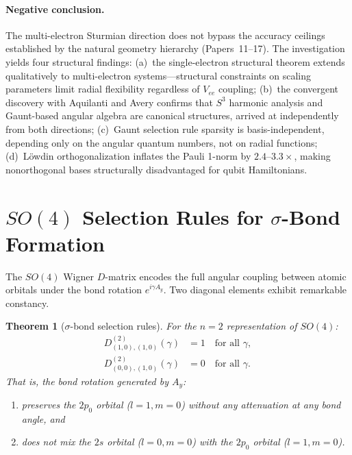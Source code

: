 \documentclass[aps,pra,twocolumn,superscriptaddress,longbibliography]{revtex4-2}
\newtheorem{theorem}{Theorem}
\theoremstyle{remark}
\theoremstyle{plain}
\begin{document}
\paragraph{Negative conclusion.}
The multi-electron Sturmian direction does not bypass the accuracy
ceilings established by the natural geometry hierarchy
(Papers~11--17).  The investigation yields four structural findings:
(a)~the single-electron structural theorem extends qualitatively to
multi-electron systems---structural constraints on scaling parameters
limit radial flexibility regardless of $V_{ee}$ coupling;
(b)~the convergent discovery with Aquilanti and Avery confirms that
$S^3$ harmonic analysis and Gaunt-based angular algebra are
canonical structures, arrived at independently from both directions;
(c)~Gaunt selection rule sparsity is basis-independent, depending only
on the angular quantum numbers, not on radial functions;
(d)~L\"owdin orthogonalization inflates the Pauli 1-norm by
$2.4$--$3.3\times$, making nonorthogonal bases structurally disadvantaged
for qubit Hamiltonians.


\section{$SO(4)$ Selection Rules for $\sigma$-Bond Formation}
\label{sec:selection_rules}

The $SO(4)$ Wigner $D$-matrix encodes the full angular coupling between
atomic orbitals under the bond rotation $e^{i\gamma A_y}$.  Two diagonal
elements exhibit remarkable constancy.

\begin{theorem}[$\sigma$-bond selection rules]
\label{thm:selection}
For the $n = 2$ representation of $SO(4)$:
\begin{align}
D^{(2)}_{(1,0),(1,0)}(\gamma) &= 1 \quad \text{for all } \gamma,
\label{eq:D2_1010} \\
D^{(2)}_{(0,0),(1,0)}(\gamma) &= 0 \quad \text{for all } \gamma.
\label{eq:D2_0010}
\end{align}
That is, the bond rotation generated by $A_y$:
\begin{enumerate}
\item preserves the $2p_0$ orbital ($l = 1, m = 0$) without any
attenuation at any bond angle, and
\item does not mix the $2s$ orbital ($l = 0, m = 0$) with the $2p_0$
orbital ($l = 1, m = 0$).
\end{enumerate}
\end{theorem}
\end{document}
